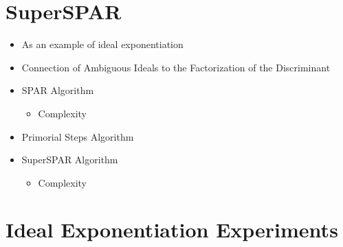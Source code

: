 \documentclass[11pt, letterpaper]{article}
\theoremstyle{definition}
\begin{document}
\bigbreak
\section{SuperSPAR}
\begin{itemize}
\item As an example of ideal exponentiation
\item Connection of Ambiguous Ideals to the Factorization of the Discriminant
\item SPAR Algorithm
	\begin{itemize}
		\item Complexity
	\end{itemize}
\item Primorial Steps Algorithm
\item SuperSPAR Algorithm
	\begin{itemize}
		\item Complexity
	\end{itemize}
\end{itemize}


\bigbreak
\section{Ideal Exponentiation Experiments}
\end{document}
